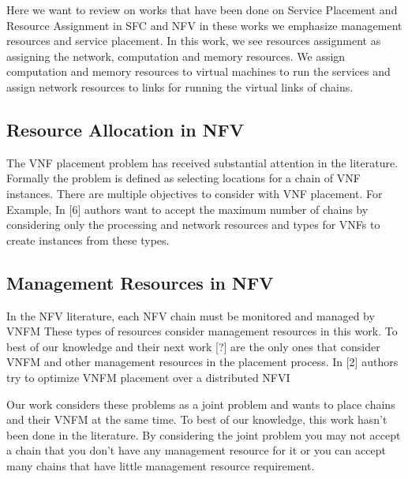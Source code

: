 Here we want to review on works that have been done on Service Placement and Resource Assignment
in SFC and NFV in these works we emphasize management resources and service placement.
In this work, we see resources assignment as assigning the network, computation and memory resources.
We assign computation and memory resources to virtual machines to run the services and assign network resources to links for running the virtual links of chains.

\subsection{Resource Allocation in NFV}
The VNF placement problem has received substantial attention in the literature.
Formally the problem is defined as selecting locations for a chain of VNF instances.
There are multiple objectives to consider with VNF placement.
For Example, In [6] authors want to accept the maximum number of chains by considering only the processing and network resources and types for VNFs to create instances from these types.

\subsection{Management Resources in NFV}
In the NFV literature, each NFV chain must be monitored and managed by VNFM
These types of resources consider management resources in this work.
To best of our knowledge \cite{AbuLebdeh2017} and their next work [?] are the only ones that consider VNFM and other management resources in the placement process.
In [2] authors try to optimize VNFM placement over a distributed NFVI

Our work considers these problems as a joint problem and wants to place chains and their VNFM at the same time. To best of our knowledge, this work hasn't been done in the literature. By considering the joint problem you may not accept a chain that you don't have any management resource for it or you can accept many chains that have little management resource requirement.

